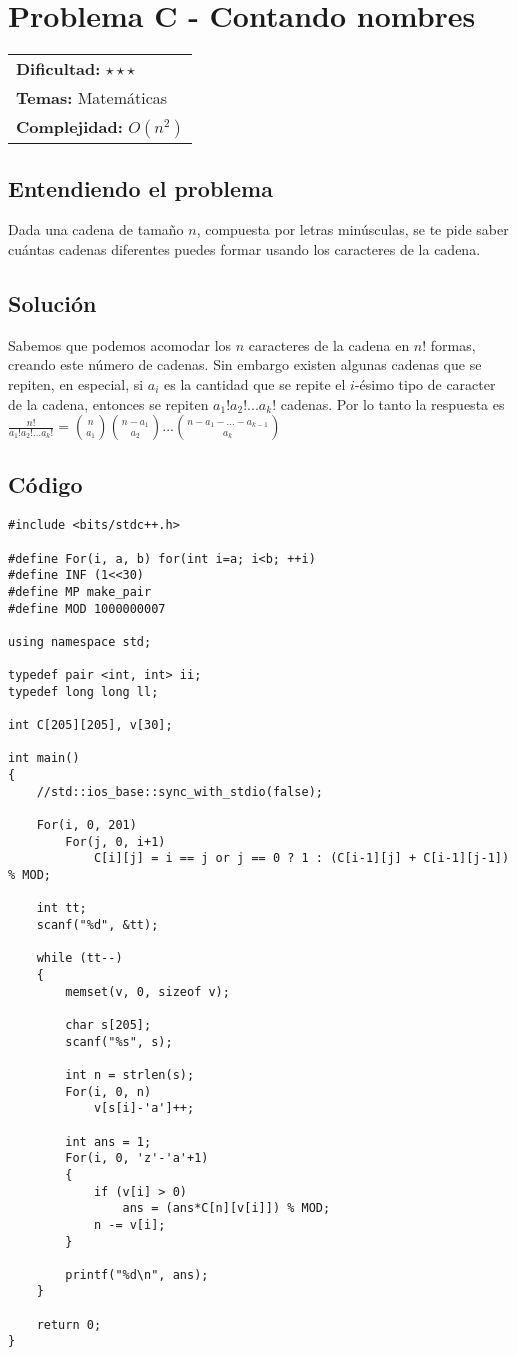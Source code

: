 \section{Problema C - Contando nombres}

\hfill
\begin{tabular}{@{}l@{}}
\textbf{Dificultad:} $\star \star \star$ \\
\textbf{Temas:} Matemáticas \\
\textbf{Complejidad:} $O(n^2)$
\end{tabular}

\subsection*{Entendiendo el problema}
Dada una cadena de tamaño $n$, compuesta por letras minúsculas, se te pide saber cuántas cadenas diferentes puedes formar usando los caracteres de la cadena.
\subsection*{Solución}
Sabemos que podemos acomodar los $n$ caracteres de la cadena en $n!$ formas, creando este número de cadenas. Sin embargo existen algunas cadenas que se repiten, en especial, si $a_i$ es la cantidad que se repite el $i$-ésimo tipo de caracter de la cadena, entonces se repiten $a_1!a_2!...a_k!$ cadenas. Por lo tanto la respuesta es $\displaystyle \frac{n!}{a_1!a_2!...a_k!} = \displaystyle \binom{n}{a_1}\binom{n-a_1}{a_2}...\binom{n-a_1-...-a_{k-1}}{a_k}$
\subsection*{Código}
\begin{verbatim}
#include <bits/stdc++.h>
 
#define For(i, a, b) for(int i=a; i<b; ++i)
#define INF (1<<30)
#define MP make_pair
#define MOD 1000000007
 
using namespace std;
 
typedef pair <int, int> ii;
typedef long long ll;
 
int C[205][205], v[30];
 
int main()
{
    //std::ios_base::sync_with_stdio(false);
 
    For(i, 0, 201)
        For(j, 0, i+1)
            C[i][j] = i == j or j == 0 ? 1 : (C[i-1][j] + C[i-1][j-1]) % MOD;
 
    int tt;
    scanf("%d", &tt);
 
    while (tt--)
    {
        memset(v, 0, sizeof v);
         
        char s[205];
        scanf("%s", s);
 
        int n = strlen(s);
        For(i, 0, n)
            v[s[i]-'a']++;
 
        int ans = 1;
        For(i, 0, 'z'-'a'+1)
        {
            if (v[i] > 0)
                ans = (ans*C[n][v[i]]) % MOD;
            n -= v[i];
        }
 
        printf("%d\n", ans);
    }
 
    return 0;
}
\end{verbatim}

